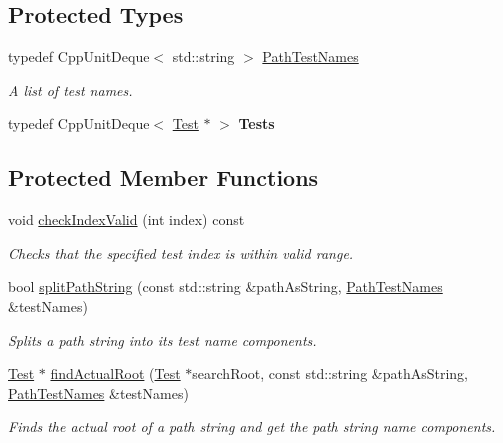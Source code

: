 \subsection*{Protected Types}
\begin{DoxyCompactItemize}
\item 
typedef Cpp\+Unit\+Deque$<$ std\+::string $>$ \hyperlink{class_test_path_a525c33f5b897710bf37cf593160e562a}{Path\+Test\+Names}\hypertarget{class_test_path_a525c33f5b897710bf37cf593160e562a}{}\label{class_test_path_a525c33f5b897710bf37cf593160e562a}

\begin{DoxyCompactList}\small\item\em A list of test names. \end{DoxyCompactList}\item 
typedef Cpp\+Unit\+Deque$<$ \hyperlink{class_test}{Test} $\ast$ $>$ {\bfseries Tests}\hypertarget{class_test_path_aa1f2a0a7e01597a16ed041776297fbdf}{}\label{class_test_path_aa1f2a0a7e01597a16ed041776297fbdf}

\end{DoxyCompactItemize}
\subsection*{Protected Member Functions}
\begin{DoxyCompactItemize}
\item 
void \hyperlink{class_test_path_aebf839170b1a9e8199dd26f307028b6a}{check\+Index\+Valid} (int index) const 
\begin{DoxyCompactList}\small\item\em Checks that the specified test index is within valid range. \end{DoxyCompactList}\item 
bool \hyperlink{class_test_path_a7b65b26e7287763ca94ff0fadca37652}{split\+Path\+String} (const std\+::string \&path\+As\+String, \hyperlink{class_test_path_a525c33f5b897710bf37cf593160e562a}{Path\+Test\+Names} \&test\+Names)
\begin{DoxyCompactList}\small\item\em Splits a path string into its test name components. \end{DoxyCompactList}\item 
\hyperlink{class_test}{Test} $\ast$ \hyperlink{class_test_path_a4fb2b835af58884dc718a3692f013868}{find\+Actual\+Root} (\hyperlink{class_test}{Test} $\ast$search\+Root, const std\+::string \&path\+As\+String, \hyperlink{class_test_path_a525c33f5b897710bf37cf593160e562a}{Path\+Test\+Names} \&test\+Names)
\begin{DoxyCompactList}\small\item\em Finds the actual root of a path string and get the path string name components. \end{DoxyCompactList}\end{DoxyCompactItemize}
